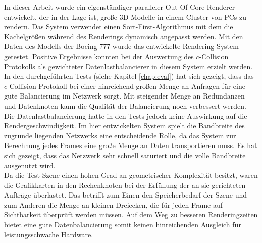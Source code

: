 In dieser Arbeit wurde ein eigenständiger paralleler Out-Of-Core Renderer entwickelt, der in der Lage ist, große 3D-Modelle in einem Cluster von PCs zu rendern. Das System verwendet einen Sort-First-Algorithmus mit dem die Kachelgrößen während des Renderings dynamisch angepasst werden. Mit den Daten des Modells der Boeing 777 wurde das entwickelte Rendering-System getestet. Positive Ergebnisse konnten bei der Auswertung des $c$-Collision Protokolls als gewichteter Datenlastbalancierer in diesem System erzielt werden. \\
In den durchgeführten Tests (siehe Kapitel \ref{chap:eval}) hat sich gezeigt, dass das $c$-Collision Protokoll bei einer hinreichend großen Menge an Anfragen für eine gute Balancierung im Netzwerk sorgt. Mit steigender Menge an Redundanzen und Datenknoten kann die Qualität der Balancierung noch verbessert werden. Die Datenlastbalancierung hatte in den Tests jedoch keine Auswirkung auf die Rendergeschwindigkeit. Im hier entwickelten System spielt die Bandbreite des zugrunde liegenden Netzwerks eine entscheidende Rolle, da das System zur Berechnung jedes Frames eine große Menge an Daten transportieren muss. Es hat sich gezeigt, dass das Netzwerk sehr schnell saturiert und die volle Bandbreite ausgenutzt wird. \\
Da die Test-Szene einen hohen Grad an geometrischer Komplexität besitzt, waren die Grafikkarten in den Rechenknoten bei der Erfüllung der an sie gerichteten Aufträge überlastet. Das betrifft zum Einen den Speicherbedarf der Szene und zum Anderen die Menge an kleinen Dreiecken, die für jeden Frame auf Sichtbarkeit überprüft werden müssen. Auf dem Weg zu besseren Renderingzeiten bietet eine gute Datenbalancierung somit keinen hinreichenden Ausgleich für leistungsschwache Hardware. 

